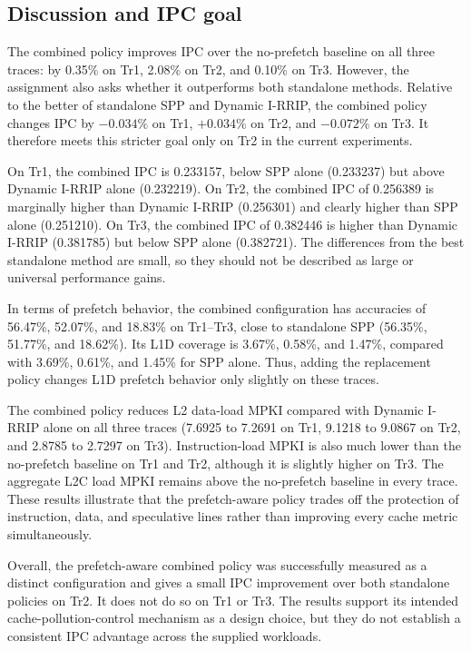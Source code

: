 
\subsection{Discussion and IPC goal}
The combined policy improves IPC over the no-prefetch baseline on all three traces: by 0.35\% on Tr1, 2.08\% on Tr2, and 0.10\% on Tr3. However, the assignment also asks whether it outperforms both standalone methods. Relative to the better of standalone SPP and Dynamic I-RRIP, the combined policy changes IPC by $-0.034\%$ on Tr1, $+0.034\%$ on Tr2, and $-0.072\%$ on Tr3. It therefore meets this stricter goal only on Tr2 in the current experiments.

On Tr1, the combined IPC is 0.233157, below SPP alone (0.233237) but above Dynamic I-RRIP alone (0.232219). On Tr2, the combined IPC of 0.256389 is marginally higher than Dynamic I-RRIP (0.256301) and clearly higher than SPP alone (0.251210). On Tr3, the combined IPC of 0.382446 is higher than Dynamic I-RRIP (0.381785) but below SPP alone (0.382721). The differences from the best standalone method are small, so they should not be described as large or universal performance gains.

In terms of prefetch behavior, the combined configuration has accuracies of 56.47\%, 52.07\%, and 18.83\% on Tr1--Tr3, close to standalone SPP (56.35\%, 51.77\%, and 18.62\%). Its L1D coverage is 3.67\%, 0.58\%, and 1.47\%, compared with 3.69\%, 0.61\%, and 1.45\% for SPP alone. Thus, adding the replacement policy changes L1D prefetch behavior only slightly on these traces.

The combined policy reduces L2 data-load MPKI compared with Dynamic I-RRIP alone on all three traces (7.6925 to 7.2691 on Tr1, 9.1218 to 9.0867 on Tr2, and 2.8785 to 2.7297 on Tr3). Instruction-load MPKI is also much lower than the no-prefetch baseline on Tr1 and Tr2, although it is slightly higher on Tr3. The aggregate L2C load MPKI remains above the no-prefetch baseline in every trace. These results illustrate that the prefetch-aware policy trades off the protection of instruction, data, and speculative lines rather than improving every cache metric simultaneously.

Overall, the prefetch-aware combined policy was successfully measured as a distinct configuration and gives a small IPC improvement over both standalone policies on Tr2. It does not do so on Tr1 or Tr3. The results support its intended cache-pollution-control mechanism as a design choice, but they do not establish a consistent IPC advantage across the supplied workloads.
